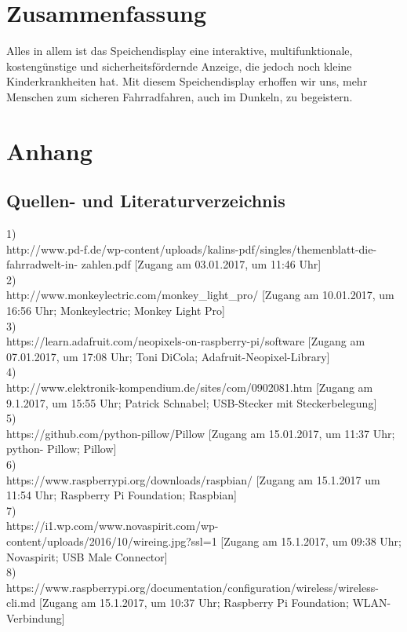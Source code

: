 \documentclass [a4paper, 11pt] {article}
\begin{document}
\section{Zusammenfassung}
Alles in allem ist das Speichendisplay eine interaktive, multifunktionale, kostengünstige und sicherheitsfördernde Anzeige, die jedoch noch kleine Kinderkrankheiten hat. Mit diesem Speichendisplay erhoffen wir uns, mehr Menschen zum sicheren Fahrradfahren, auch im Dunkeln, zu begeistern.
\section{Anhang}
\subsection{Quellen- und Literaturverzeichnis}
1)\\
http://www.pd-f.de/wp-content/uploads/kalins-pdf/singles/themenblatt-die-fahrradwelt-in- zahlen.pdf [Zugang am 03.01.2017, um 11:46 Uhr] \\
2)\\
http://www.monkeylectric.com/monkey\_light\_pro/ [Zugang am 10.01.2017, um 16:56 Uhr; Monkeylectric; Monkey Light Pro]\\
3)\\
https://learn.adafruit.com/neopixels-on-raspberry-pi/software [Zugang am 07.01.2017, um 17:08 Uhr; Toni DiCola; Adafruit-Neopixel-Library]\\
4)\\
http://www.elektronik-kompendium.de/sites/com/0902081.htm [Zugang am 9.1.2017, um 15:55 Uhr; Patrick Schnabel; USB-Stecker mit Steckerbelegung]\\
5)\\
https://github.com/python-pillow/Pillow [Zugang am 15.01.2017, um 11:37 Uhr; python- Pillow; Pillow]\\
6)\\
https://www.raspberrypi.org/downloads/raspbian/ [Zugang am 15.1.2017 um 11:54 Uhr; Raspberry Pi Foundation; Raspbian]\\
7)\\
https://i1.wp.com/www.novaspirit.com/wp-content/uploads/2016/10/wireing.jpg?ssl=1 [Zugang am 15.1.2017, um 09:38 Uhr; Novaspirit; USB Male Connector]\\
8)\\
https://www.raspberrypi.org/documentation/configuration/wireless/wireless-cli.md [Zugang am 15.1.2017, um 10:37 Uhr; Raspberry Pi Foundation; WLAN-Verbindung]\\
\end{document}
